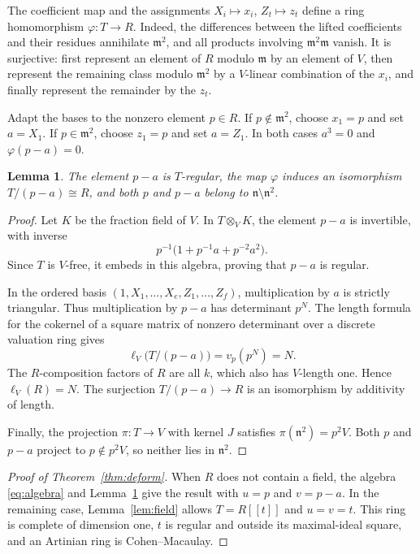 \documentclass[11pt]{article}
\newtheorem{lemma}[theorem]{Lemma}
\theoremstyle{remark}\newtheorem{remark}[theorem]{Remark}
\newcommand{\m}{\mathfrak m}
\newcommand{\n}{\mathfrak n}
\begin{document}
The coefficient map and the assignments $X_i\mapsto x_i$, $Z_t\mapsto z_t$ define a ring homomorphism $\varphi:T\to R$. Indeed, the differences between the lifted coefficients and their residues annihilate $\m^2$, and all products involving $\m^2\m$ vanish. It is surjective: first represent an element of $R$ modulo $\m$ by an element of $V$, then represent the remaining class modulo $\m^2$ by a $V$-linear combination of the $x_i$, and finally represent the remainder by the $z_t$.

Adapt the bases to the nonzero element $p\in R$. If $p\notin\m^2$, choose $x_1=p$ and set $a=X_1$. If $p\in\m^2$, choose $z_1=p$ and set $a=Z_1$. In both cases $a^3=0$ and $\varphi(p-a)=0$.

\begin{lemma}\label{lem:length}
The element $p-a$ is $T$-regular, the map $\varphi$ induces an isomorphism $T/(p-a)\cong R$, and both $p$ and $p-a$ belong to $\n\setminus\n^2$.
\end{lemma}
\begin{proof}
Let $K$ be the fraction field of $V$. In $T\otimes_V K$, the element $p-a$ is invertible, with inverse
\[
 p^{-1}\bigl(1+p^{-1}a+p^{-2}a^2\bigr).
\]
Since $T$ is $V$-free, it embeds in this algebra, proving that $p-a$ is regular.

In the ordered basis $(1,X_1,\ldots,X_e,Z_1,\ldots,Z_f)$, multiplication by $a$ is strictly triangular. Thus multiplication by $p-a$ has determinant $p^N$. The length formula for the cokernel of a square matrix of nonzero determinant over a discrete valuation ring gives
\[
 \ell_V\bigl(T/(p-a)\bigr)=v_p(p^N)=N.
\]
The $R$-composition factors of $R$ are all $k$, which also has $V$-length one. Hence $\ell_V(R)=N$. The surjection $T/(p-a)\to R$ is an isomorphism by additivity of length.

Finally, the projection $\pi:T\to V$ with kernel $J$ satisfies $\pi(\n^2)=p^2V$. Both $p$ and $p-a$ project to $p\notin p^2V$, so neither lies in $\n^2$.
\end{proof}

\begin{proof}[Proof of Theorem~\ref{thm:deform}]
When $R$ does not contain a field, the algebra \eqref{eq:algebra} and Lemma~\ref{lem:length} give the result with $u=p$ and $v=p-a$. In the remaining case, Lemma~\ref{lem:field} allows $T=R[[t]]$ and $u=v=t$. This ring is complete of dimension one, $t$ is regular and outside its maximal-ideal square, and an Artinian ring is Cohen--Macaulay.
\end{proof}
\end{document}
